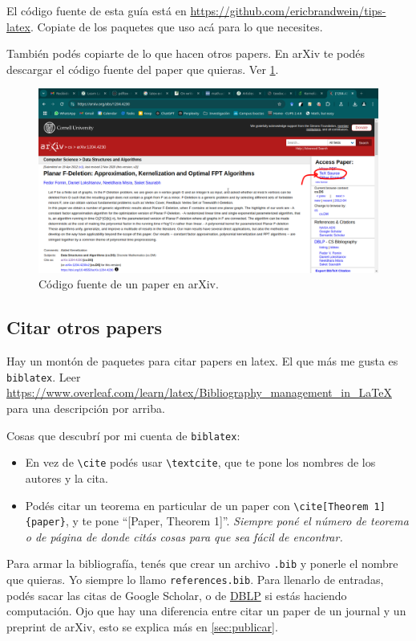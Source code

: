\documentclass{article}
\begin{document}
El código fuente de esta guía está en \url{https://github.com/ericbrandwein/tips-latex}. Copiate de los paquetes que uso acá para lo que necesites.

También podés copiarte de lo que hacen otros papers. En arXiv te podés descargar el código fuente del paper que quieras. Ver \cref{fig:tex-source-en-arXiv}.

\begin{figure}[ht]
\centering
\includegraphics[width=\textwidth]{img/tex-source-en-arXiv.png}
\caption{Código fuente de un paper en arXiv.}
\label{fig:tex-source-en-arXiv}
\end{figure}

\subsection{Citar otros papers}
Hay un montón de paquetes para citar papers en latex. El que más me gusta es \texttt{biblatex}. Leer \url{https://www.overleaf.com/learn/latex/Bibliography_management_in_LaTeX} para una descripción por arriba.

Cosas que descubrí por mi cuenta de \texttt{biblatex}:
\begin{itemize}
\item En vez de \verb|\cite| podés usar \verb|\textcite|, que te pone los nombres de los autores y la cita.
\item Podés citar un teorema en particular de un paper con \verb|\cite[Theorem 1]{paper}|, y te pone ``[Paper, Theorem 1]''. \emph{Siempre poné el número de teorema o de página de donde citás cosas para que sea fácil de encontrar.}
\end{itemize}

Para armar la bibliografía, tenés que crear un archivo \texttt{.bib} y ponerle el nombre que quieras. Yo siempre lo llamo \texttt{references.bib}. Para llenarlo de entradas, podés sacar las citas de Google Scholar, o de \href{https://dblp.org/}{DBLP} si estás haciendo computación. Ojo que hay una diferencia entre citar un paper de un journal y un preprint de arXiv, esto se explica más en \cref{sec:publicar}.
\end{document}
